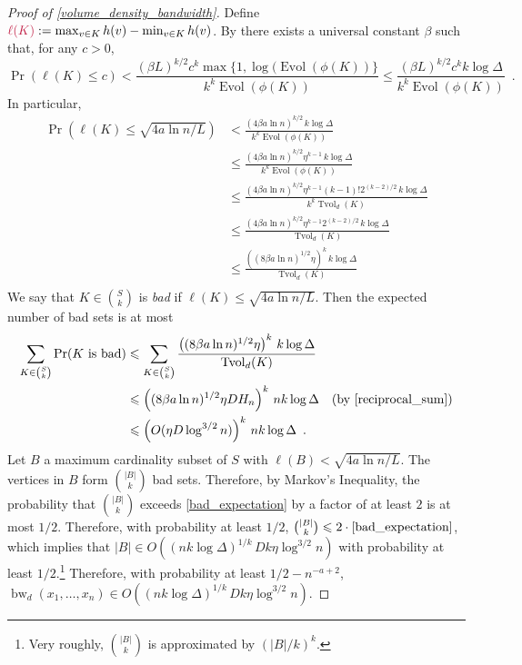 \documentclass{patmorin}
\makeatletter
\renewcommand{\le}{\leqslant}
\newcommand{\defin}[1]{\emph{\textcolor{brightmaroon}{#1}}}
\def\mathcolor#1#{\@mathcolor{#1}}
\def\@mathcolor#1#2#3{%
  \protect\leavevmode
  \begingroup
    \color#1{#2}#3%
  \endgroup
}
\newcommand{\mathdefin}[1]{\mathcolor{brightmaroon}{#1}}
\DeclareMathOperator{\bw}{bw}
\DeclareMathOperator{\evol}{Evol}
\DeclareMathOperator{\tvol}{Tvol}
\makeatother
\begin{document}
\begin{proof}[Proof of \cref{volume_density_bandwidth}]
  Define $\mathdefin{\ell(K)}:=\max_{v\in K}h(v)-\min_{v\in K} h(v)$.  By \cite[Theorem~9]{feige:approximating} there exists a universal constant $\beta$ such that, for any $c>0$,
  \[
      \Pr(\ell(K) \le c)
        < \frac{(\beta L)^{k/2}c^k\max\{1,\log(\evol(\phi(K))\}}{k^k\evol(\phi(K))}
        \le \frac{(\beta L)^{k/2}c^kk\log\Delta}{k^k\evol(\phi(K))} \enspace .
  \]
  In particular,
  \begin{align*}
    \Pr(\ell(K) \le \sqrt{4a\ln n/L})
      & <
      \frac{(4\beta a\ln n)^{k/2}\, k\log\Delta}{k^k\evol(\phi(K))} \\
      & \le \frac{(4\beta a\ln n)^{k/2}\eta^{k-1}\, k\log\Delta}{k^k\evol(\phi(K))} \\
      & \le \frac{(4\beta a\ln n)^{k/2}\eta^{k-1}(k-1)!2^{(k-2)/2}\, k\log\Delta}{k^k\tvol_{d}(K)} \\
      & \le \frac{(4\beta a\ln n)^{k/2}\eta^{k-1}2^{(k-2)/2}\,k\log\Delta}{\tvol_{d}(K)} \\
      & \le \frac{\left((8\beta a\ln n)^{1/2}\eta\right)^{k}\,k\log\Delta}{\tvol_{d}(K)} \\
  \end{align*}
  We say that $K\in\binom{S}{k}$ is \defin{bad} if $\ell(K) \le \sqrt{4a\ln n/L}$. Then the expected number of bad sets is at most
  \begin{align}
    \sum_{K\in \binom{S}{k}} \Pr(\text{$K$ is bad})
    & \le \sum_{K\in \binom{S}{k}} \frac{\left((8\beta a\ln n)^{1/2}\eta\right)^{k}\, k\log\Delta}{\tvol_{d}(K)} \notag \\
    & \le \left((8\beta a\ln n)^{1/2}\eta DH_n\right)^{k}\, nk\log\Delta
    & \text{(by \cref{reciprocal_sum})} \notag \\
    & \le \left(O(\eta D\log^{3/2}n)\right)^{k}\, nk\log\Delta \enspace .
    \label{bad_expectation}
  \end{align}
  Let $B$ a maximum cardinality subset of $S$ with $\ell(B)<\sqrt{4a\ln n/L}$.  The vertices in $B$ form $\binom{|B|}{k}$ bad sets. Therefore, by Markov's Inequality, the probability that $\binom{|B|}{k}$ exceeds \eqref{bad_expectation} by a factor of at least $2$ is at most $1/2$.  Therefore, with probability at least $1/2$, $\binom{|B|}{k}\le 2\cdot\eqref{bad_expectation}$, which implies that $|B|\in O((nk\log\Delta)^{1/k}\,Dk\eta\log^{3/2} n)$ with probability at least $1/2$.\footnote{Very roughly, $\binom{|B|}{k}$ is approximated by $(|B|/k)^k$.}  Therefore, with probability at least $1/2-n^{-a+2}$, $\bw_d(x_1,\ldots,x_n)\in O((nk\log\Delta)^{1/k}\,Dk\eta\log^{3/2} n)$.
\end{proof}
\end{document}
